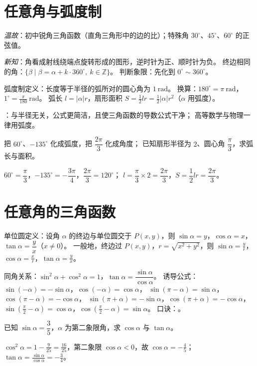 \begin{procedure}

\section{任意角与弧度制}
\textit{温故}：初中锐角三角函数（直角三角形中的边的比）；特殊角 $30^\circ$、$45^\circ$、$60^\circ$ 的正弦值。

\textit{新知}：角看成射线绕端点旋转形成的图形，逆时针为正、顺时针为负。
终边相同的角：$\{\beta\mid\beta=\alpha+k\cdot360^\circ,\ k\in\mathbb{Z}\}$。
判断象限：先化到 $0^\circ\sim360^\circ$。

弧度制定义：长度等于半径的弧所对的圆心角为 $1\ \text{rad}$。
换算：$180^\circ=\pi\ \text{rad}$，$1^\circ=\frac{\pi}{180}\ \text{rad}$。
弧长 $l=|\alpha|r$，扇形面积 $S=\frac12lr=\frac12|\alpha|r^2$（$\alpha$ 用弧度）。

：与半径无关，公式更简洁，且使三角函数的导数公式干净；
高等数学与物理一律用弧度。

\begin{example}
把 $60^\circ$、$-135^\circ$ 化成弧度，把 $\dfrac{2\pi}{3}$ 化成角度；
已知扇形半径为 $2$、圆心角 $\dfrac{\pi}{3}$，求弧长与面积。
\end{example}
\begin{solution}
$60^\circ=\dfrac{\pi}{3}$，$-135^\circ=-\dfrac{3\pi}{4}$，$\dfrac{2\pi}{3}=120^\circ$；
$l=\dfrac{\pi}{3}\times2=\dfrac{2\pi}{3}$，$S=\dfrac12lr=\dfrac{2\pi}{3}$。
\end{solution}

\section{任意角的三角函数}
单位圆定义：设角 $\alpha$ 的终边与单位圆交于 $P(x,y)$，则
$\sin\alpha=y$，$\cos\alpha=x$，$\tan\alpha=\dfrac{y}{x}$（$x\neq0$）。
一般地，终边过 $P(x,y)$，$r=\sqrt{x^2+y^2}$，则 $\sin\alpha=\frac{y}{r}$，$\cos\alpha=\frac{x}{r}$，$\tan\alpha=\frac{y}{x}$。

同角关系：$\sin^2\alpha+\cos^2\alpha=1$，$\tan\alpha=\dfrac{\sin\alpha}{\cos\alpha}$。
诱导公式：$\sin(-\alpha)=-\sin\alpha$，$\cos(-\alpha)=\cos\alpha$，
$\sin(\pi-\alpha)=\sin\alpha$，$\cos(\pi-\alpha)=-\cos\alpha$，
$\sin(\pi+\alpha)=-\sin\alpha$，$\cos(\pi+\alpha)=-\cos\alpha$，
$\sin\left(\frac{\pi}{2}-\alpha\right)=\cos\alpha$，$\cos\left(\frac{\pi}{2}-\alpha\right)=\sin\alpha$。
口诀：。

\begin{example}
已知 $\sin\alpha=\dfrac35$，$\alpha$ 为第二象限角，求 $\cos\alpha$ 与 $\tan\alpha$。
\end{example}
\begin{solution}
$\cos^2\alpha=1-\frac{9}{25}=\frac{16}{25}$，第二象限 $\cos\alpha<0$，故 $\cos\alpha=-\frac45$；
$\tan\alpha=\frac{\sin\alpha}{\cos\alpha}=-\frac34$。
\end{solution}


\end{procedure}
